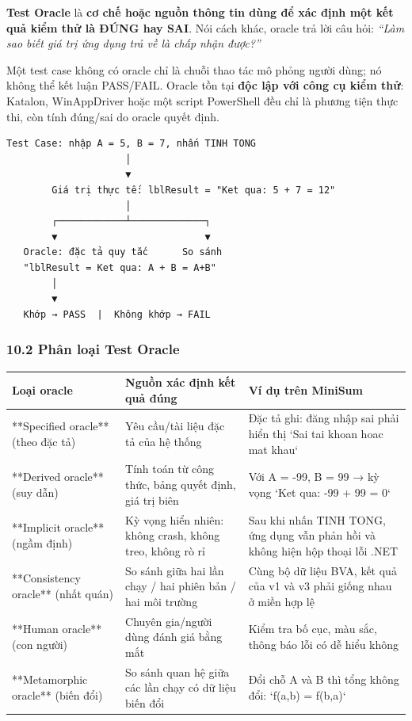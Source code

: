 \textbf{Test Oracle} là \textbf{cơ chế hoặc nguồn thông tin dùng để xác định một kết quả kiểm thử là ĐÚNG hay SAI}. Nói cách khác, oracle trả lời câu hỏi: \textit{“Làm sao biết giá trị ứng dụng trả về là chấp nhận được?”}

Một test case không có oracle chỉ là chuỗi thao tác mô phỏng người dùng; nó không thể kết luận PASS/FAIL. Oracle tồn tại \textbf{độc lập với công cụ kiểm thử}: Katalon, WinAppDriver hoặc một script PowerShell đều chỉ là phương tiện thực thi, còn tính đúng/sai do oracle quyết định.

\begin{lstlisting}
Test Case: nhập A = 5, B = 7, nhấn TINH TONG
                     │
                     ▼
        Giá trị thực tế: lblResult = "Ket qua: 5 + 7 = 12"
                     │
        ┌────────────┴─────────────┐
        ▼                          ▼
   Oracle: đặc tả quy tắc      So sánh
   "lblResult = Ket qua: A + B = A+B"
        │
        ▼
   Khớp → PASS  |  Không khớp → FAIL
\end{lstlisting}


\subsubsection{10.2 Phân loại Test Oracle}

\begin{table}[H]
\centering
\begin{tabular}{|l|l|l|}
\hline
\textbf{Loại oracle} & \textbf{Nguồn xác định kết quả đúng} & \textbf{Ví dụ trên MiniSum} \\ \hline
**Specified oracle** (theo đặc tả) & Yêu cầu/tài liệu đặc tả của hệ thống & Đặc tả ghi: đăng nhập sai phải hiển thị `Sai tai khoan hoac mat khau` \\ \hline
**Derived oracle** (suy dẫn) & Tính toán từ công thức, bảng quyết định, giá trị biên & Với A = -99, B = 99 → kỳ vọng `Ket qua: -99 + 99 = 0` \\ \hline
**Implicit oracle** (ngầm định) & Kỳ vọng hiển nhiên: không crash, không treo, không rò rỉ & Sau khi nhấn TINH TONG, ứng dụng vẫn phản hồi và không hiện hộp thoại lỗi .NET \\ \hline
**Consistency oracle** (nhất quán) & So sánh giữa hai lần chạy / hai phiên bản / hai môi trường & Cùng bộ dữ liệu BVA, kết quả của v1 và v3 phải giống nhau ở miền hợp lệ \\ \hline
**Human oracle** (con người) & Chuyên gia/người dùng đánh giá bằng mắt & Kiểm tra bố cục, màu sắc, thông báo lỗi có dễ hiểu không \\ \hline
**Metamorphic oracle** (biến đổi) & So sánh quan hệ giữa các lần chạy có dữ liệu biến đổi & Đổi chỗ A và B thì tổng không đổi: `f(a,b) = f(b,a)` \\ \hline
\end{tabular}
\end{table}




